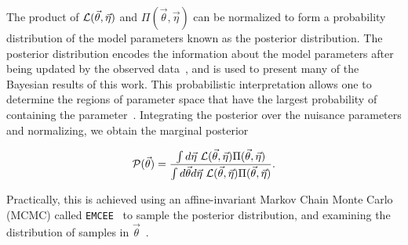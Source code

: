 The product of $\mathcal{L}(\vec\theta, \vec\eta)$ and $\Pi(\vec\theta, \vec\eta)$ can be normalized to form a probability distribution of the model parameters known as the posterior distribution.
The posterior distribution encodes the information about the model parameters after being updated by the observed data~\cite{RevModPhys.83.943}, and is used to present many of the Bayesian results of this work.
This probabilistic interpretation allows one to determine the regions of parameter space that have the largest probability of containing the parameter~\cite{laplace1820theorie}.
Integrating the posterior over the nuisance parameters and normalizing, we obtain the marginal posterior
\begin{linenomath*}
	\begin{equation}
	\mathcal{P}(\vec\theta) = \frac{\int d\vec\eta~\mathcal{L}(\vec\theta,\vec\eta) \Pi(\vec\theta,\vec\eta)}{\int d\vec\theta d\vec\eta~\mathcal{L}(\vec\theta,\vec\eta) \Pi(\vec\theta,\vec\eta)}.
	\label{eq:likelihood_bayes}
	\end{equation}
\end{linenomath*}
Practically, this is achieved using an affine-invariant Markov Chain Monte Carlo (MCMC) called \texttt{EMCEE}~\cite{ForemanMackey:2012ig} to sample the posterior distribution, and examining the distribution of samples in $\vec\theta$~\cite{RevModPhys.83.943}.


